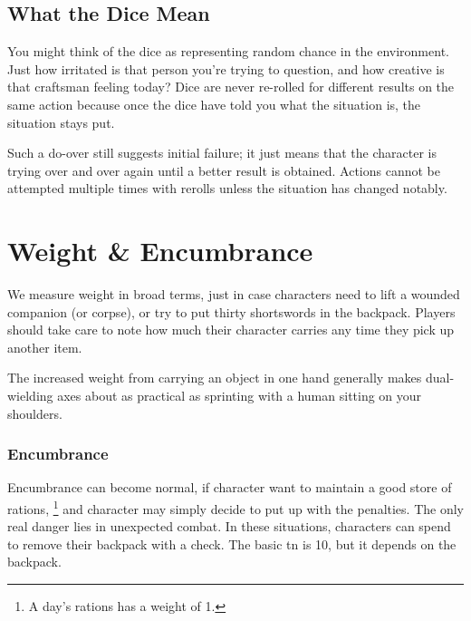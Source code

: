\begin{multicols}{2}
\subsection{What the Dice Mean}

You might think of the dice as representing random chance in the environment. Just how irritated is that person you're trying to question, and how creative is that craftsman feeling today? Dice are never re-rolled for different results on the same action because once the dice have told you what the situation is, the situation stays put.

Such a do-over still suggests initial failure; it just means that the character is trying over and over again until a better result is obtained.
Actions cannot be attempted multiple times with rerolls unless the situation has changed notably.

\end{multicols}

\section{Weight \& Encumbrance}
\label{weight}

\begin{multicols}{2}

\noindent
We measure weight in broad terms, just in case characters need to lift a wounded companion (or corpse), or try to put thirty shortswords in the backpack.
Players should take care to note how much their character carries any time they pick up another item.



The increased weight from carrying an object in one hand generally makes dual-wielding axes about as practical as sprinting with a human sitting on your shoulders.

\subsubsection{Encumbrance}

Encumbrance can become normal, if character want to maintain a good store of rations,%
\footnote{A day's rations has a \gls{weight} of 1.}
and character may simply decide to put up with the penalties.
The only real danger lies in unexpected combat.
In these situations, characters can spend  to remove their backpack with a  check.
The basic \gls{tn} is 10, but it depends on the backpack.


\end{multicols}


